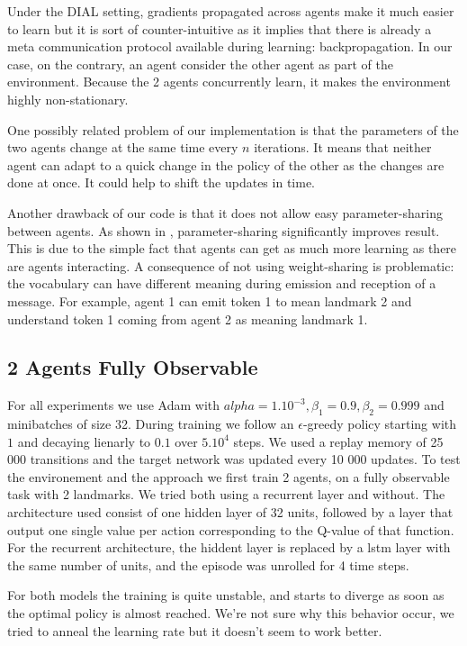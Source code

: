 \documentclass{article} %
\begin{document}
Under the DIAL setting, gradients propagated across agents make it much easier to learn but it is sort of counter-intuitive as it implies that there is already a meta communication protocol available during learning: backpropagation. In our case, on the contrary, an agent consider the other agent as part of the environment. Because the 2 agents concurrently learn, it makes the environment highly non-stationary. 

One possibly related problem of our implementation is that the parameters of the two agents change at the same time every $n$ iterations. It means that neither agent can adapt to a quick change in the policy of the other as the changes are done at once. It could help to shift the updates in time.

Another drawback of our code is that it does not allow easy parameter-sharing between agents. As shown in \cite{foerster2016learning}, parameter-sharing significantly improves result. This is due to the simple fact that agents can get as much more learning as there are agents interacting. A consequence of not using weight-sharing is problematic: the vocabulary can have different meaning during emission and reception of a message. For example, agent 1 can emit token 1 to mean landmark 2 and understand token 1 coming from agent 2 as meaning landmark 1. 

\subsection{2 Agents Fully Observable}
For all experiments we use Adam \cite{kingma2014adam} with $alpha=1.10^{-3}, \beta_1=0.9, \beta_2=0.999$ and minibatches of size 32. During training we follow an $\epsilon$-greedy policy starting with $1$ and decaying lienarly to $0.1$ over $5.10^4$ steps. We used a replay memory of 25 000 transitions and the target network was updated every 10 000 updates.
To test the environement and the approach we first train 2 agents, on a fully observable task with 2 landmarks.
We tried both using a recurrent layer and without. The architecture used  consist of one hidden layer of 32 units, followed by a layer that output one single value per action corresponding to the Q-value of that function. For the recurrent architecture, the hiddent layer is replaced by a lstm layer with the same number of units, and the episode was unrolled for 4 time steps.

For both models the training is quite unstable, and starts to diverge as soon as the optimal policy is almost reached. We're not sure why this behavior occur, we tried to anneal the learning rate but it doesn't seem to work better.
\end{document}
